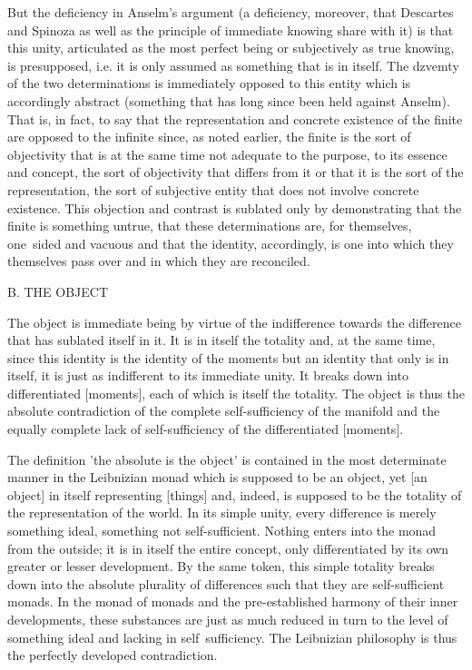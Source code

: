 But the deficiency in Anselm's argument
(a deficiency, moreover, that Descartes and Spinoza as well as
the principle of immediate knowing share with it)
is that this unity, articulated as the most
perfect being or subjectively as true knowing,
is presupposed, i.e. it is only assumed as
something that is in itself.
The dzvemty of the two determinations is
immediately opposed to this entity
which is accordingly abstract
(something that has long since been held against Anselm).
That is, in fact, to say that the
representation and concrete existence of the finite
are opposed to the infinite since, as noted earlier,
the finite is the sort of objectivity
that is at the same time not adequate
to the purpose, to its essence and concept,
the sort of objectivity that differs from it
or that it is the sort of the representation,
the sort of subjective entity that
does not involve concrete existence.
This objection and contrast is
sublated only by demonstrating
that the finite is something untrue,
that these determinations are,
for themselves, one~sided and vacuous
and that the identity, accordingly,
is one into which they themselves
pass over and in which they are reconciled.

B. THE OBJECT

The object is immediate being by virtue of
the indifference towards the difference
that has sublated itself in it.
It is in itself the totality
and, at the same time,
since this identity is the identity of the moments
but an identity that only is in itself,
it is just as indifferent to its immediate unity.
It breaks down into differentiated [moments],
each of which is itself the totality.
The object is thus the absolute contradiction of
the complete self-sufficiency of the manifold
and the equally complete lack of self-sufficiency
of the differentiated [moments].

The definition 'the absolute is the object'
is contained in the most determinate manner
in the Leibnizian monad which is supposed to be an object,
yet [an object] in itself representing [things]
and, indeed, is supposed to be the totality of
the representation of the world.
In its simple unity,
every difference is merely something ideal,
something not self-sufficient.
Nothing enters into the monad from the outside;
it is in itself the entire concept,
only differentiated by its own
greater or lesser development.
By the same token, this simple totality breaks down
into the absolute plurality of differences such
that they are self-sufficient monads.
In the monad of monads and the pre-established harmony
of their inner developments,
these substances are just as much reduced in turn
to the level of something ideal
and lacking in self~sufficiency.
The Leibnizian philosophy is thus
the perfectly developed contradiction.

